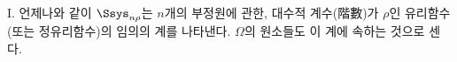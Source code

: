 
I. 언제나와 같이 $\Ssys_{n\rho}$는 $n$개의 부정원에 관한, 대수적 계수(階數)가 $\rho$인 유리함수(또는 정유리함수)의 임의의 계를 나타낸다. $\Omega$의 원소들도 이 계에 속하는 것으로 센다.
